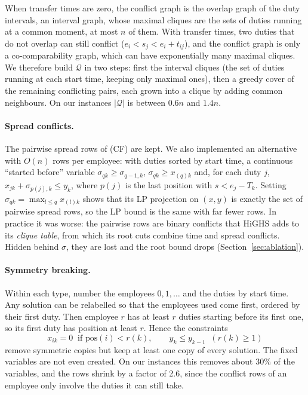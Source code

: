 When transfer times are zero, the conflict graph is the overlap graph of the
duty intervals, an interval graph, whose maximal cliques are the sets of
duties running at a common moment, at most $n$ of them. With transfer
times, two duties that do not overlap can still conflict ($e_i<s_j<e_i+t_{ij}$),
and the conflict graph is only a co-comparability graph, which can have
exponentially many maximal cliques. We therefore build $\mathcal Q$ in two
steps: first the interval cliques (the set of duties running at each start
time, keeping only maximal ones), then a greedy cover of the remaining
conflicting pairs, each grown into a clique by adding common neighbours.
On our instances $|\mathcal Q|$ is between $0.6n$ and $1.4n$.

\paragraph{Spread conflicts.} The pairwise spread rows of (CF) are kept.
We also implemented an alternative with $O(n)$ rows per employee: with duties
sorted by start time, a continuous ``started before'' variable
$\sigma_{qk}\ge\sigma_{q-1,k}$, $\sigma_{qk}\ge x_{(q)k}$ and, for each duty
$j$, $x_{jk}+\sigma_{p(j),k}\le y_k$, where $p(j)$ is the last position with
$s<e_j-T_k$. Setting $\sigma_{qk}=\max_{l\le q}x_{(l)k}$ shows that its LP
projection on $(x,y)$ is exactly the set of pairwise spread rows, so the LP
bound is the same with far fewer rows. In practice it was worse: the
pairwise rows are binary conflicts that HiGHS adds to its \emph{clique table},
from which its root cuts combine time and spread conflicts. Hidden behind
$\sigma$, they are lost and the root bound drops (Section~\ref{sec:ablation}).

\paragraph{Symmetry breaking.} Within each type, number the employees
$0,1,\dots$ and the duties by start time. Any solution can be relabelled so
that the employees used come first, ordered by their first duty. Then
employee $r$ has at least $r$ duties starting before its first one, so its
first duty has position at least $r$. Hence the constraints
\begin{equation}\label{cfp:sym}
  x_{ik}=0 \;\;\text{if } \mathrm{pos}(i)<r(k),\qquad
  y_{k}\le y_{k-1}\;\;(r(k)\ge 1)
\end{equation}
remove symmetric copies but keep at least one copy of every solution. The
fixed variables are not even created. On our instances this removes about
30\% of the variables, and the rows shrink by a factor of 2.6, since the
conflict rows of an employee only involve the duties it can still take.

